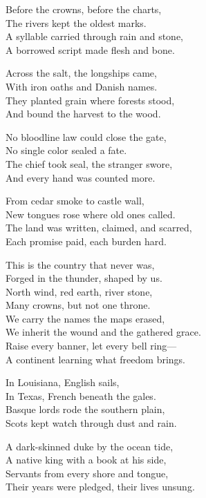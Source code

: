 \begin{lyrics}
Before the crowns, before the charts,\\
The rivers kept the oldest marks.\\
A syllable carried through rain and stone,\\
A borrowed script made flesh and bone.

Across the salt, the longships came,\\
With iron oaths and Danish names.\\
They planted grain where forests stood,\\
And bound the harvest to the wood.

No bloodline law could close the gate,\\
No single color sealed a fate.\\
The chief took seal, the stranger swore,\\
And every hand was counted more.

From cedar smoke to castle wall,\\
New tongues rose where old ones called.\\
The land was written, claimed, and scarred,\\
Each promise paid, each burden hard.

This is the country that never was,\\
Forged in the thunder, shaped by us.\\
North wind, red earth, river stone,\\
Many crowns, but not one throne.\\
We carry the names the maps erased,\\
We inherit the wound and the gathered grace.\\
Raise every banner, let every bell ring—\\
A continent learning what freedom brings.

In Louisiana, English sails,\\
In Texas, French beneath the gales.\\
Basque lords rode the southern plain,\\
Scots kept watch through dust and rain.

A dark-skinned duke by the ocean tide,\\
A native king with a book at his side,\\
Servants from every shore and tongue,\\
Their years were pledged, their lives unsung.


\end{lyrics}
